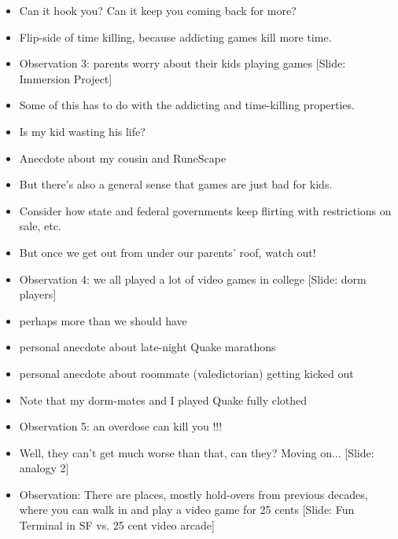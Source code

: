\documentclass[12pt]{article}
\begin{document}
{\begin{itemize}
\item Can it hook you?  Can it keep you coming back for more?

\item Flip-side of time killing, because addicting games kill more time.

\item Observation 3: parents worry about their kids playing games [Slide: Immersion Project]

\item Some of this has to do with the addicting and time-killing properties.

\item Is my kid wasting his life?

\item Anecdote about my cousin and RuneScape

\item But there's also a general sense that games are just bad for kids.

\item Consider how state and federal governments keep flirting with restrictions on sale, etc.

\item But once we get out from under our parents' roof, watch out!

\item Observation 4: we all played a lot of video games in college [Slide: dorm players]

\item perhaps more than we should have

\item personal anecdote about late-night Quake mara\-thons

\item personal anecdote about roommate (valedictorian) getting kicked out

\item Note that my dorm-mates and I played Quake fully clothed

\item Observation 5:  an overdose can kill you !!!


\item Well, they can't get much worse than that, can they?  Moving on...  [Slide:  analogy 2]


\item Observation:  There are places, mostly hold-overs from previous decades, where you can walk in and play a video game for 25 cents [Slide:  Fun Terminal in SF vs. 25 cent video arcade]


\end{itemize}}
\end{document}
